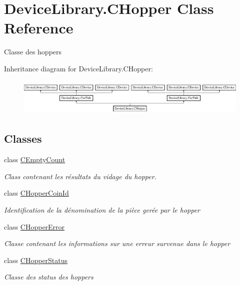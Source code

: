 \hypertarget{class_device_library_1_1_c_hopper}{}\section{Device\+Library.\+C\+Hopper Class Reference}
\label{class_device_library_1_1_c_hopper}


Classe des hoppers  


Inheritance diagram for Device\+Library.\+C\+Hopper\+:\begin{figure}[H]
\begin{center}
\leavevmode
\includegraphics[height=1.794872cm]{class_device_library_1_1_c_hopper}
\end{center}
\end{figure}
\subsection*{Classes}
\begin{DoxyCompactItemize}
\item 
class \mbox{\hyperlink{class_device_library_1_1_c_hopper_1_1_c_empty_count}{C\+Empty\+Count}}
\begin{DoxyCompactList}\small\item\em Class contenant les résultats du vidage du hopper. \end{DoxyCompactList}\item 
class \mbox{\hyperlink{class_device_library_1_1_c_hopper_1_1_c_hopper_coin_id}{C\+Hopper\+Coin\+Id}}
\begin{DoxyCompactList}\small\item\em Identification de la dénomination de la pièce gerée par le hopper \end{DoxyCompactList}\item 
class \mbox{\hyperlink{class_device_library_1_1_c_hopper_1_1_c_hopper_error}{C\+Hopper\+Error}}
\begin{DoxyCompactList}\small\item\em Classe contenant les informations sur une erreur survenue dans le hopper \end{DoxyCompactList}\item 
class \mbox{\hyperlink{class_device_library_1_1_c_hopper_1_1_c_hopper_status}{C\+Hopper\+Status}}
\begin{DoxyCompactList}\small\item\em Classe des status des hoppers \end{DoxyCompactList}\end{DoxyCompactItemize}
